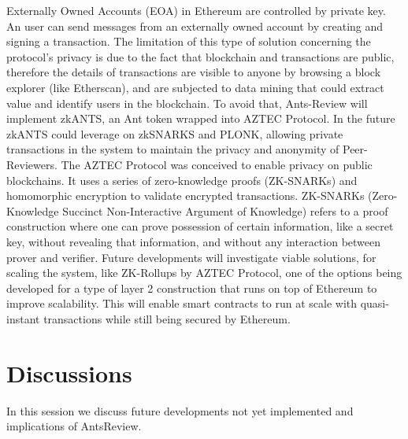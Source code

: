 \documentclass[runningheads]{llncs}
\begin{document}
 Externally Owned Accounts (EOA) in Ethereum are controlled by private key. An user can send messages from an externally owned account by creating and signing a transaction. The limitation of this type of solution concerning the protocol's privacy is due to the fact that blockchain and transactions are public, therefore the details of transactions are visible to anyone by browsing a block explorer (like Etherscan), and are subjected to data mining that could extract value and identify users in the blockchain.
\newline To avoid that, Ants-Review will implement zkANTS, an Ant token wrapped into AZTEC Protocol. In the future zkANTS could leverage on zkSNARKS and PLONK, allowing private transactions in the system to maintain the privacy and anonymity of Peer-Reviewers.
\newline The AZTEC Protocol was conceived to enable privacy on public blockchains. It uses a series of zero-knowledge proofs (ZK-SNARKs) and homomorphic encryption to validate encrypted transactions.
\newline ZK-SNARKs (Zero-Knowledge Succinct Non-Interactive Argument of Knowledge) \cite{ZKSNARKs} refers to a proof construction where one can prove possession of certain information, like a secret key, without revealing that information, and without any interaction between prover and verifier.
\newline Future developments will investigate viable solutions, for scaling the system, like ZK-Rollups by AZTEC Protocol, one of the options being developed for a type of layer 2 construction that runs on top of Ethereum to improve scalability. This will enable smart contracts to run  at scale with quasi-instant transactions while still being secured by Ethereum.

\section{Discussions}
In this session we discuss future developments not yet implemented and implications of AntsReview.
\end{document}
